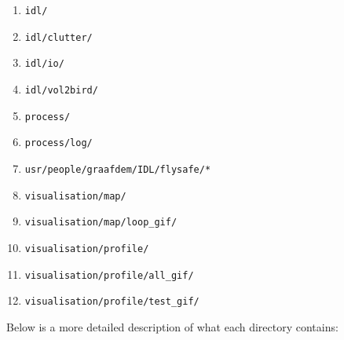 \begin{enumerate}
\item{\texttt{idl/}}
\item{\texttt{idl/clutter/}}
\item{\texttt{idl/io/}}
\item{\texttt{idl/vol2bird/}}
\item{\texttt{process/}}
\item{\texttt{process/log/}}
\item{\texttt{usr/people/graafdem/IDL/flysafe/*}}
\item{\texttt{visualisation/map/}}
\item{\texttt{visualisation/map/loop\_gif/}}
\item{\texttt{visualisation/profile/}}
\item{\texttt{visualisation/profile/all\_gif/}}
\item{\texttt{visualisation/profile/test\_gif/}}
\end{enumerate}
Below is a more detailed description of what each directory contains:


